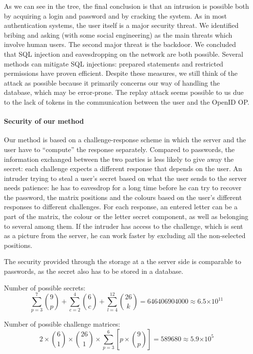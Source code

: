 \documentclass[11pt,a4paper]{article}
\providecommand{\e}[1]{\ensuremath{\times 10^{#1}}}
\begin{document}
As we can see in the tree, the final conclusion is that an intrusion is possible both by acquiring a login and password and by cracking the system. As in most authentication systems, the user itself is a major security threat. We identified bribing and asking (with some social engineering) as the main threats which involve human users. The second major threat is the backdoor.
We concluded that SQL injection and eavesdropping on the network are both possible. Several methods can mitigate SQL injections: prepared statements and restricted permissions have proven efficient. Despite these measures, we still think of the attack as possible because it primarily concerns our way of handling the database, which may be error-prone.
The replay attack seems possible to us due to the lack of tokens in the communication between the user and the OpenID OP.

\paragraph{Security of our method}
Our method is based on a challenge-response scheme in which the server and the user have to ``compute'' the response separately.
Compared to passwords, the information exchanged between the two parties is less likely to give away the secret: each challenge expects a different response that depends on the user.
An intruder trying to steal a user's secret based on what the user sends to the server needs patience: he has to eavesdrop for a long time before he can try to recover the password, the matrix positions and the colours based on the user's different responses to different challenges. For each response, an entered letter can be a part of the matrix, the colour or the letter secret component, as well as belonging to several among them.
If the intruder has access to the challenge, which is sent as a picture from the server, he can work faster by excluding all the non-selected positions.

The security provided through the storage at a the server side is comparable to passwords, as the secret also has to be stored in a database.

Number of possible secrets:
$$ \sum\limits_{p=3}^{7}{9 \choose p} +  \sum\limits_{c=2}^{4}{6 \choose c} + \sum\limits_{l=4}^{12}{26 \choose k} = 646 406 904 000 \approx 6.5\e{11}$$

Number of possible challenge matrices:
$$ 2 \times {6 \choose 1} \times {26 \choose 1} \times \sum\limits_{p=3}^{6}\left[{p\times {9 \choose p}}\right] = 589680 \approx 5.9\e{5}$$
\end{document}

